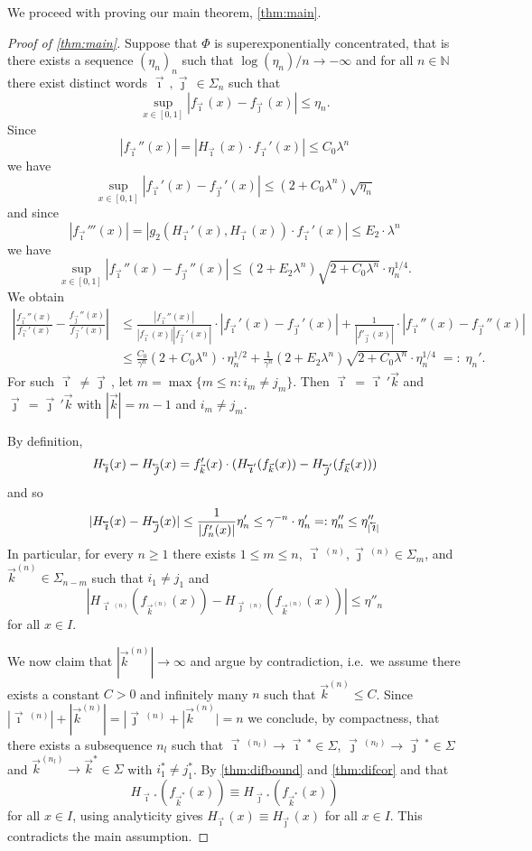 \documentclass[12pt,]{article}
\theoremstyle{definition}
\theoremstyle{remark}
\renewcommand{\Bbb}[1]{\mathbb{#1}}
\newcommand{\bbN}{{\Bbb N}}         %
\newcommand{\0}{\mathbf{0}}
\newcommand{\cev}[1]{\reflectbox{\ensuremath{\vec{\reflectbox{\ensuremath{#1}}}}}}
\newcommand{\bi}{\vec{\imath}\,}
\newcommand{\bj}{\vec{\jmath}\,}
\newcommand{\bk}{{\vec{k}}}
\newcommand{\bbi}{\,\cev{\imath}}
\newcommand{\bbj}{\,\cev{\jmath}}
\begin{document}
We proceed with proving our main theorem, \cref{thm:main}.
\begin{proof}[Proof of \cref{thm:main}]
  Suppose that $\Phi$ is superexponentially concentrated, that is there exists a sequence
  $(\eta_n)_n$ such that $\log(\eta_n)/n\to-\infty$ and for all $n\in\bbN$ there exist distinct
  words $\bi,\bj\in\Sigma_n$ such that
  \[
    \sup_{x\in[0,1]}|f_{\bi}(x)-f_{\bj}(x)| \leq \eta_n.
  \]
  Since 
  \[
    |f_{\bi}''(x)| = |H_{\bi}(x)\cdot f_{\bi}'(x)|\leq C_0 \lambda^n
  \]
  we have
  \[
    \sup_{x\in[0,1]}|f_{\bi}'(x) - f_{\bj}'(x)| \leq (2+C_0 \lambda^n)\sqrt{\eta_n}
  \]
  and since
  \[
    |f_{\bi}'''(x)| = |g_2(H_{\bi}'(x),H_{\bi}(x))\cdot f_{\bi}'(x)| \leq E_2\cdot \lambda^n
  \]
  we have 
  \[
    \sup_{x\in[0,1]}|f_{\bi}''(x) - f_{\bj}''(x)| \leq (2+E_2\lambda^n)\sqrt{2+C_0 \lambda^n}\cdot
    \eta_n^{1/4}.
  \]
  We obtain
  \begin{align*}
    \left|\frac{f_{\bi}''(x)}{f_{\bi}'(x)} - \frac{f_{\bj}''(x)}{f_{\bj}'(x)}\right|
    &\leq
    \frac{|f_{\bi}''(x)|}{|f_{\bi}(x)||f_{\bj}'(x)|}\cdot|f_{\bi}'(x) - f_{\bj}'(x)|
    +\frac{1}{|f'_{\bj}(x)|} \cdot |f_{\bi}''(x) - f_{\bj}''(x)|
    \\
    & 
    \leq \frac{C_0}{\gamma^n}(2+C_0\lambda^n)\cdot \eta_n^{1/2} +\frac{1}{\gamma^n}(2+E_2
    \lambda^n)\sqrt{2+C_0 \lambda^n} \cdot \eta_n^{1/4} \;=:\;\eta_n'.
  \end{align*}
  For such $\bi\neq\bj$, let $m = \max\{m\leq n : i_m \neq j_m\}$. Then $\bi = \bi'\bk$ and $\bj =
  \bj'\bk$ with $|\bk| = m-1$ and $i_m\neq j_m$.

  By definition,
  \[
    H_{\bbi}(x) - H_{\bbj}(x) = f_{\bk}'(x)\cdot (H_{\bbi'}(f_{\bk}(x)) - H_{\bbj'}(f_{\bk}(x)))
  \]
  and so
  \[
    |H_{\bbi}(x) - H_{\bbj}(x)| \leq \frac{1}{|f'_n(x)|} \eta_n' \leq \gamma^{-n} \cdot \eta_n'
    =:\eta_n'' \leq \eta''_{|\bbi|}
  \]
  In particular, for every $n\geq 1$ there exists $1\leq m\leq n$, $\bi^{(n)},\bj^{(n)}\in\Sigma_m$,
  and $\bk^{(n)}\in\Sigma_{n-m}$ such that $i_1 \neq j_1$ and
  \[
    |H_{\bi^{(n)}}(f_{\bk^{(n)}}(x)) - H_{\bj^{(n)}}(f_{\bk^{(n)}}(x))| \leq \eta''_n
  \]
  for all $x\in I$.

  We now claim that $|\bk^{(n)}| \to \infty$ and argue by contradiction, i.e.\ we assume there
  exists a constant $C>0$ and infinitely many $n$ such that $\bk^{(n)} \leq C$. 
  Since $|\bi^{(n)}|+ |\bk^{(n)}| = |\bj^{(n)}+|\bk^{(n)}| = n$ we conclude, by compactness, that
  there exists a subsequence $n_l$ such that $\bi^{(n_l)} \to \bi^*\in\Sigma$,
  $\bj^{(n_l)}\to\bj^*\in\Sigma$ and $\bk^{(n_l)}\to \bk^*\in\Sigma$ with $i_1^*\neq j_1^*$.
  By \cref{thm:difbound} and \cref{thm:difcor} and that 
  \[
    H_{\bi^*}(f_{\bk^*}(x))\equiv H_{\bj^*}(f_{\bk^*}(x)) 
  \]
  for all $x\in I$, using analyticity gives $H_{\bi}(x) \equiv H_{\bj}(x)$ for all $x\in I$. This
  contradicts the main assumption.


\end{proof}
\end{document}
